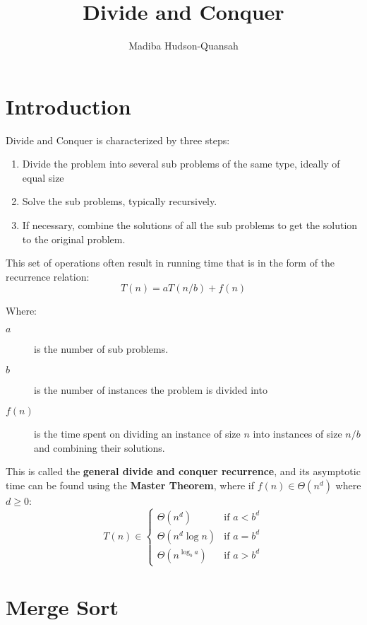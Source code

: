 \documentclass[12pt letter]{report}
\title{\Huge{Divide and Conquer}}
\author{\huge{Madiba Hudson-Quansah}}
\date{}
\begin{document}
\maketitle
\newpage
{}
\tableofcontents
\pagebreak

\chapter{Introduction}

Divide and Conquer is characterized by three steps:
\begin{enumerate}
  \item Divide the problem into several sub problems of the same type, ideally of equal size
  \item Solve the sub problems, typically recursively.
  \item If necessary, combine the solutions of all the sub problems to get the solution to the original
        problem.
\end{enumerate}

This set of operations often result in running time that is in the form of the recurrence relation:
\[
  T \left( n \right)  = a T \left( n / b \right)  + f \left( n \right)
\]

Where:
\begin{description}
  \item[ $a$]  is the number of sub problems.
  \item[ $ b$] is the number of instances the problem is divided into
  \item [ $ f \left( n \right) $] is the time spent on dividing an instance of size $n$ into instances of size $n / b$
        and combining their solutions.
\end{description}
This is called the \textbf{general divide and conquer recurrence}, and its asymptotic time can be found using the
\textbf{Master Theorem}, where if $f \left( n \right) \in \Theta \left( n ^{d} \right)  $ where $d \geq 0$:
\[
  T \left( n \right) \in \begin{cases}
    \Theta \left( n^{d} \right)         & \text{if } a < b^{d}  \\
    \Theta \left( n ^{d} \log n \right) & \text{if } a = b^{d}  \\
    \Theta \left( n ^{\log_b a} \right) & \text{if } a > b ^{d}
  \end{cases}
\]

\chapter{Merge Sort}
\end{document}
